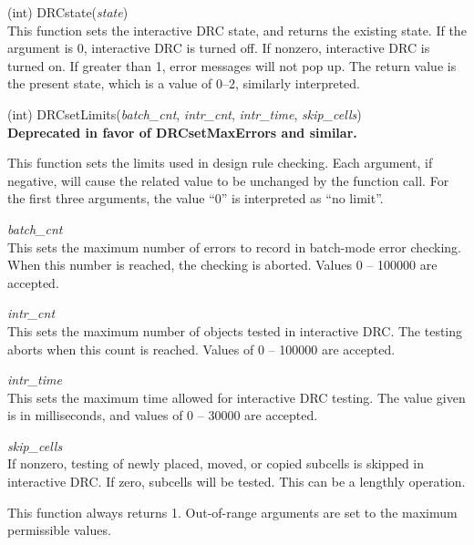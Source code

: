 \begin{description}
\item{(int) \vt DRCstate({\it state\/})}\\
This function sets the interactive DRC state, and returns the existing
state.  If the argument is 0, interactive DRC is turned off.  If
nonzero, interactive DRC is turned on.  If greater than 1, error
messages will not pop up.  The return value is the present state,
which is a value of 0--2, similarly interpreted.

\item{(int) \vt DRCsetLimits({\it batch\_cnt}, {\it intr\_cnt},
  {\it intr\_time}, {\it skip\_cells\/})}\\
{\bf Deprecated in favor of DRCsetMaxErrors and similar.}

This function sets the limits used in design rule checking.  Each
argument, if negative, will cause the related value to be unchanged by
the function call.  For the first three arguments, the value ``0'' is
interpreted as ``no limit''.

\begin{description}
\item{\it batch\_cnt}\\
This sets the maximum number of errors to record in batch-mode error
checking.  When this number is reached, the checking is aborted. 
Values 0 -- 100000 are accepted.
\item{\it intr\_cnt}\\
This sets the maximum number of objects tested in interactive DRC. 
The testing aborts when this count is reached.  Values of 0 -- 100000
are accepted.
\item{\it intr\_time}\\
This sets the maximum time allowed for interactive DRC testing.  The
value given is in milliseconds, and values of 0 -- 30000 are accepted.
\item{\it skip\_cells}\\
If nonzero, testing of newly placed, moved, or copied subcells is
skipped in interactive DRC.  If zero, subcells will be tested.  This
can be a lengthly operation.
\end{description}

This function always returns 1.  Out-of-range arguments are set to the
maximum permissible values.


\end{description}

